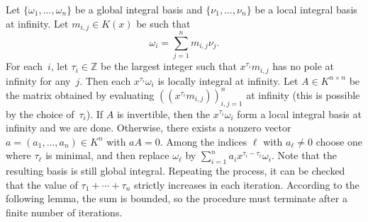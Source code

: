 \documentclass{sig-alternate}
\let\set\mathbb
\begin{document}
Let $\{\omega_1,\dots,\omega_n\}$ be a global integral basis and $\{\nu_1,\dots,\nu_n\}$ be a local
integral basis at infinity. Let $m_{i,j}\in K(x)$ be such that
\[
 \omega_i = \sum_{j=1}^n m_{i,j}\nu_j.
\]
For each~$i$, let $\tau_i\in\set Z$ be the largest integer such that $x^{\tau_i}m_{i,j}$ has no pole at infinity for any~$j$.
Then each $x^{\tau_i}\omega_i$ is locally integral at infinity.
Let $A\in K^{n\times n}$ be the matrix obtained by evaluating $((x^{\tau_i}m_{i,j}))_{i,j=1}^n$ at infinity
(this is possible by the choice of~$\tau_i$).
If $A$ is invertible, then the $x^{\tau_i}\omega_i$ form a local integral basis at infinity and we are done.
Otherwise, there exists a nonzero vector $a=(a_1,\dots,a_n)\in K^n$ with $aA=0$.
Among the indices $\ell$ with $a_\ell\neq0$ choose one where $\tau_\ell$ is minimal,
and then replace $\omega_\ell$ by $\sum_{i=1}^n a_i x^{\tau_i-\tau_\ell}\omega_i$.
Note that the resulting basis is still global integral.
Repeating the process, it can be checked that the value of $\tau_1+\cdots+\tau_n$ strictly increases in each iteration.
According to the following lemma, the sum is bounded, so the procedure must terminate after a finite
number of iterations.
\end{document}
